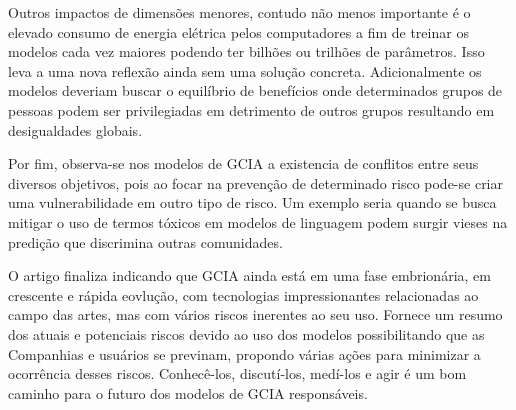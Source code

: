 Outros impactos de dimensões menores, contudo não menos importante é o elevado consumo de energia elétrica pelos computadores a fim de treinar os modelos 
cada vez maiores podendo ter bilhões ou trilhões de parâmetros. Isso leva a uma nova reflexão ainda sem uma solução 
concreta. Adicionalmente os modelos deveriam buscar o equilíbrio de benefícios onde determinados grupos de 
pessoas podem ser privilegiadas em detrimento de outros grupos resultando em desigualdades globais.

Por fim, observa-se nos modelos de GCIA a existencia de conflitos entre seus diversos objetivos, pois ao focar na prevenção 
de determinado risco pode-se criar uma vulnerabilidade em outro tipo de risco. Um exemplo seria quando se busca mitigar 
o uso de termos tóxicos em modelos de linguagem podem surgir vieses na predição que discrimina outras 
comunidades.

O artigo finaliza indicando que GCIA ainda está em uma fase embrionária, em crescente e rápida eovlução, 
com tecnologias impressionantes relacionadas ao campo das artes, mas com vários riscos inerentes ao seu uso. 
Fornece um resumo dos atuais e potenciais riscos devido ao uso dos modelos possibilitando que as Companhias
e usuários se previnam, propondo várias ações para minimizar a ocorrência desses riscos.
Conhecê-los, discutí-los, medí-los e agir é um bom caminho para o futuro dos modelos de GCIA responsáveis.
